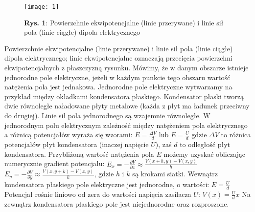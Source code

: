 \documentclass[12pt]{article}
\begin{document}
\begin{figure}[H]
\centering
\texttt{[image: 1]}
\caption*{\textbf{Rys. 1}: Powierzchnie ekwipotencjalne (linie przerywane) i linie sił pola (linie ciągłe) dipola elektrycznego}
\end{figure} 
\noindent Powierzchnie ekwipotencjalne (linie przerywane) i linie sił pola (linie ciągłe) dipola elektrycznego; linie ekwipotencjalne oznaczają przecięcia powierzchni ekwipotencjalnych z płaszczyzną rysunku. 
Mówimy, że w danym obszarze istnieje jednorodne pole elektryczne, jeżeli w każdym punkcie tego obszaru wartość natężenia pola jest jednakowa.
Jednorodne pole elektryczne wytwarzamy na przykład między okładkami kondensatora płaskiego.\newline
Kondensator płaski tworzą dwie równoległe naładowane płyty metalowe (każda z płyt ma ładunek przeciwny do drugiej). Linie sił pola jednorodnego są wzajemnie równoległe.
W jednorodnym polu elektrycznym zależność między natężeniem pola elektrycznego a różnicą potencjałów wyraża się wzorami:
{\Large $E=\frac{\Delta{V}}{d}$            lub           $E=\frac{U}{d}$}
gdzie $\Delta{V}$ to różnica potencjałów płyt kondensatora (inaczej napięcie $U$), zaś $d$ to odległość płyt kondensatora. \newline
Przybliżoną wartość natężenia pola $E$ możemy uzyskać obliczając numerycznie gradient potencjału: \newline \newline
{\Large $E_x=-\frac{\partial{V}}{\partial{x}}\approx\frac{V(x+h,y)-V(x,y)}{h}$ \newline \newline
$ E_y=-\frac{\partial{V}}{\partial{y}}\approx\frac{V(x,y+k)-V(x,y)}{k}$}, \newline \newline
gdzie $h$ i $k$ są krokami siatki. \newline  
Wewnątrz kondensatora płaskiego pole elektryczne jest jednorodne, o wartości: \newline \newline
{\Large $E=\frac{U}{d}$} \newline \newline
Potencjał rośnie liniowo od zera do wartości napięcia zasilacza $U$: \newline \newline
{\Large $V(x)=\frac{U}{d}x$} \newline \newline
Na zewnątrz kondensatora płaskiego pole jest niejednorodne oraz rozproszone. \newline
\end{document}
